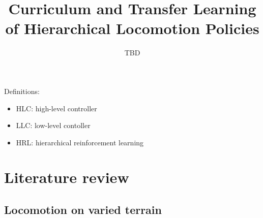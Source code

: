 \documentclass[a4paper]{article}
\title{Curriculum and Transfer Learning of Hierarchical Locomotion Policies}
\author{TBD}
\begin{document}
\maketitle

Definitions:
\begin{itemize}
  \item HLC: high-level controller
  \item LLC: low-level contoller
  \item HRL: hierarchical reinforcement learning
\end{itemize}

\section{Literature review}

\subsection*{Locomotion on varied terrain}
\end{document}
